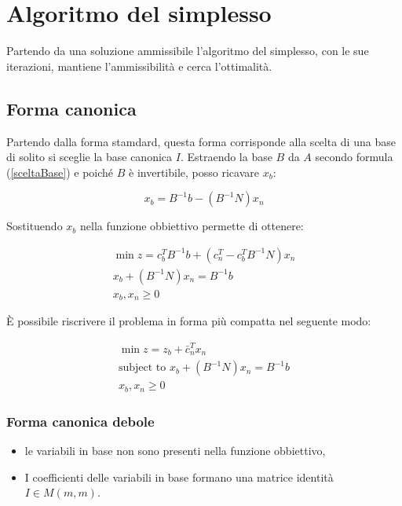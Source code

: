 \chapter{Algoritmo del simplesso}
Partendo da una soluzione ammissibile l'algoritmo del simplesso, con le sue iterazioni, mantiene l'ammissibilità e cerca l'ottimalità.

\section{Forma canonica}
Partendo dalla forma stamdard, questa forma corrisponde alla scelta di una base di solito si sceglie la base canonica $I$.
Estraendo la base $B$ da $A$ secondo formula (\ref{sceltaBase}) e poiché $B$ è invertibile, posso ricavare $x_b$:

\begin{equation}\label{xB}
x_b=B^{-1}b-(B^{-1}N)x_n
\end{equation}

Sostituendo $x_b$ nella funzione obbiettivo permette di ottenere:

\begin{equation}\label{formaCanonicaEstesa}
    \begin{array}{c}
	\min z=c_b^TB^{-1}b+(c_n^T-c_b^TB^{-1}N)x_n \\
	x_b+(B^{-1}N)x_n=B^{-1}b \\
	x_b,x_n\geq0
    \end{array}
\end{equation}

È possibile riscrivere il problema in forma più compatta nel seguente modo:

\begin{equation}\label{formaCanonicaCompatta}
    \begin{array}{c}
		\min z=z_b+\bar{c}_n^Tx_n \\
		\text{subject to } x_b+(B^{-1}N)x_n=B^{-1}b \\
		x_b,x_n\geq0
    \end{array}
\end{equation}

\subsection{Forma canonica debole}
\begin{itemize}
	\item le variabili in base non sono presenti nella funzione obbiettivo,
	\item I coefficienti delle variabili in base formano una matrice identità $I\in M(m,m)$.
\end{itemize}

